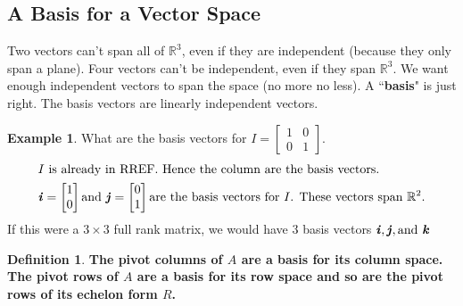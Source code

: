 \documentclass[12pt, letterpaper]{article}
\newcommand{\R}[1]{$\mathbb{R}^{#1}$}
\newcommand{\V}[1]{\textbf{\textit{#1}}}
\theoremstyle{definition}
\newtheorem{definition}{Definition}[section]
\newtheorem{example}{Example}
\begin{document}
	
	
	
\subsection{A Basis for a Vector Space}
		Two vectors can't span all of \R{3}, even if they are independent (because they only span a plane). Four vectors can't be independent, even if they span \R{3}. We want enough independent vectors to span the space (no more no less). A ``\textbf{basis}" is just right. The basis vectors are linearly independent vectors.
		
			 
			 \begin{example}
			 	What are the basis vectors for $I = \begin{bmatrix} 1 & 0 \\ 0 & 1\end{bmatrix}$.
			 	\begin{gather*}
			 		\intertext{$I$ is already in RREF. Hence the column are the basis vectors.}
			 			\V{i} =  \begin{bmatrix} 1 \\ 0\end{bmatrix} \text{and } \V{j} =  \begin{bmatrix} 0 \\ 1\end{bmatrix} \text{are the basis vectors for $I$. These vectors span \R{2}.}
			 	\end{gather*}
			 	If this were a $3 \times 3$ full rank matrix, we would have 3 basis vectors $\V{i}, \V{j}, \text{and } \V{k}$
			 \end{example}
	
	
		\begin{definition}
			\textbf{The pivot columns of $A$ are a basis for its column space. The pivot rows of $A$ are a basis for its row space and so are the pivot rows of its echelon form $R$.}
		\end{definition}
	
\end{document}
